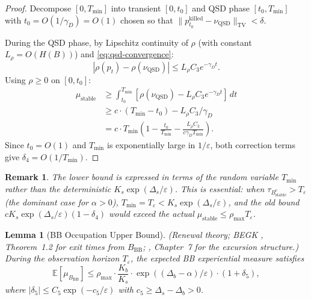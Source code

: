 \documentclass[11pt]{article}
\newtheorem{lemma}[theorem]{Lemma}
\newtheorem{remark}[theorem]{Remark}
\newcommand{\eps}{\varepsilon}
\newcommand{\Ds}{\Delta_s}
\newcommand{\Db}{\Delta_b}
\newcommand{\Bstable}{B_{\mathrm{stable}}}
\newcommand{\BBB}{B_{\mathrm{BB}}}
\newcommand{\Teps}{T_\eps}
\newcommand{\TV}{\mathrm{TV}}
\newcommand{\QSD}{\mathrm{QSD}}
\newcommand{\muBB}{\mu_{\BBB}}
\begin{document}
\begin{proof}
Decompose $[0, T_{\min}]$ into transient $[0, t_0]$ and QSD
phase $[t_0, T_{\min}]$ with $t_0 = O(1/\gamma_D) = O(1)$ chosen
so that $\|p_{t_0}^{\mathrm{killed}} - \nu_\QSD\|_\TV < \delta$.

During the QSD phase, by Lipschitz continuity of $\rho$ (with
constant $L_\rho = O(H(B))$) and \eqref{eq:qsd-convergence}:
\[
  |\rho(p_t) - \rho(\nu_\QSD)|
  \leq L_\rho C_3 e^{-\gamma_D t}.
\]
Using $\rho \geq 0$ on $[0, t_0]$:
\begin{align*}
  \mu_{\mathrm{stable}}
  &\geq \int_{t_0}^{T_{\min}}
    [\rho(\nu_\QSD) - L_\rho C_3 e^{-\gamma_D t}]\, dt \\
  &\geq c \cdot (T_{\min} - t_0)
    - L_\rho C_3 / \gamma_D \\
  &= c \cdot T_{\min}
    \left(1 - \frac{t_0}{T_{\min}}
    - \frac{L_\rho C_3}{c \gamma_D T_{\min}}\right).
\end{align*}
Since $t_0 = O(1)$ and $T_{\min}$ is exponentially large in
$1/\eps$, both correction terms give
$\delta_4 = O(1/T_{\min})$.
\end{proof}

\begin{remark}
The lower bound is expressed in terms of the random variable
$T_{\min}$ rather than the deterministic $K_s \exp(\Ds/\eps)$.
This is essential: when $\tau_{\Bstable^c} > \Teps$ (the dominant
case for $\alpha > 0$), $T_{\min} = \Teps < K_s\exp(\Ds/\eps)$, and
the old bound $c K_s \exp(\Ds/\eps)(1-\delta_4)$ would exceed the
actual $\mu_{\mathrm{stable}} \leq \rho_{\max} \Teps$.
\end{remark}

\begin{lemma}[BB Occupation Upper Bound]\label{lem:bb-upper}
\textnormal{(Renewal theory; BEGK \cite{BEGK02}, Theorem~1.2
for exit times from $\BBB$; \cite{BdH15}, Chapter~7 for the
excursion structure.)}
During the observation horizon $\Teps$, the expected BB experiential
measure satisfies
\begin{equation}\label{eq:mu-bb}
  \mathbb{E}[\muBB]
  \leq \rho_{\max} \cdot \frac{K_b}{K_s}
  \cdot \exp((\Db - \alpha)/\eps)
  \cdot (1 + \delta_5),
\end{equation}
where $|\delta_5| \leq C_5 \exp(-c_5/\eps)$ with
$c_5 \geq \Ds - \Db > 0$.
\end{lemma}
\end{document}
